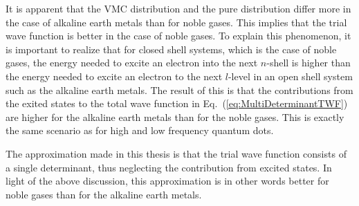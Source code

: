 It is apparent that the VMC distribution and the pure distribution differ more in the case of alkaline earth metals than for noble gases. This implies that the trial wave function is better in the case of noble gases. To explain this phenomenon, it is important to realize that for closed shell systems, which is the case of noble gases, the energy needed to excite an electron into the next $n$-shell is higher than the energy needed to excite an electron to the next $l$-level in an open shell system such as the alkaline earth metals. The result of this is that the contributions from the exited states to the total wave function in Eq.~(\ref{eq:MultiDeterminantTWF}) are higher for the alkaline earth metals than for the noble gases. This is exactly the same scenario as for high and low frequency quantum dots.

The approximation made in this thesis is that the trial wave function consists of a single determinant, thus neglecting the contribution from excited states. In light of the above discussion, this approximation is in other words better for noble gases than for the alkaline earth metals.
 
 
 
